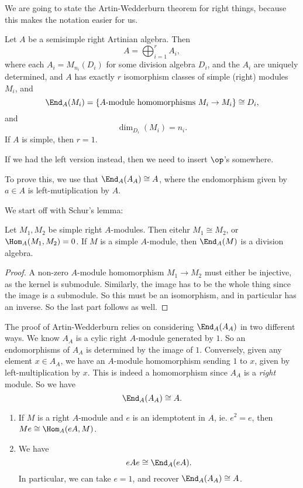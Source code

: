 \documentclass[a4paper]{article}
\begin{document}
We are going to state the Artin-Wedderburn theorem for right things, because this makes the notation easier for us.
\begin{thm}
  Let $A$ be a semisimple right Artinian algebra. Then
  \[
    A = \bigoplus_{i = 1}^r A_i,
  \]
  where each $A_i = M_{n_i}(D_i)$ for some division algebra $D_i$, and the $A_i$ are uniquely determined, and $A$ has exactly $r$ isomorphism classes of simple (right) modules $M_i$, and
  \[
    \End_A (M_i) = \{\text{$A$-module homomorphisms $M_i \to M_i$}\} \cong D_i,
  \]
  and
  \[
    \dim_{D_i}(M_i) = n_i.
  \]
  If $A$ is simple, then $r = 1$.
\end{thm}
If we had the left version instead, then we need to insert $\op$'s somewhere.

To prove this, we use that $\End_A(A_A) \cong A$, where the endomorphism given by $a \in A$ is left-mutiplication by $A$.

We start off with Schur's lemma:
\begin{lemma}
  Let $M_1, M_2$ be simple right $A$-modules. Then eitehr $M_1 \cong M_2$, or $\Hom_A(M_1, M_2) = 0$. If $M$ is a simple $A$-module, then $\End_A(M)$ is a division algebra.
\end{lemma}

\begin{proof}
  A non-zero $A$-module homomorphism $M_1 \to M_2$ must either be injective, as the kernel is submodule. Similarly, the image has to be the whole thing since the image is a submodule. So this must be an isomorphism, and in particular has an inverse. So the last part follows as well.
\end{proof}

The proof of Artin-Wedderburn relies on considering $\End_A(A_A)$ in two different ways. We know $A_A$ is a cylic right $A$-module generated by $1$. So an endomorphisms of $A_A$ is determined by the image of $1$. Conversely, given any element $x\in A_A$, we have an $A$-module homomorphism sending $1$ to $x$, given by left-multiplication by $x$. This is indeed a homomorphism since $A_A$ is a \emph{right} module. So we have
\[
  \End_A(A_A) \cong A.
\]
\begin{lemma}\leavevmode
  \begin{enumerate}
    \item If $M$ is a right $A$-module and $e$ is an idemptotent in $A$, ie. $e^2 = e$, then $Me \cong \Hom_A(eA, M)$.
    \item We have
      \[
        eAe \cong \End_A(eA).
      \]
      In particular, we can take $e = 1$, and recover $\End_A(A_A) \cong A$.
  \end{enumerate}
\end{lemma}
\end{document}
